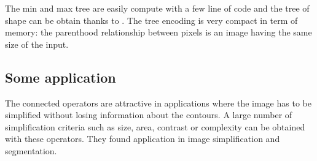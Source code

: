 The min and max tree are easily compute with a few line of code \cite{berger.07.icip} and the tree of shape can be obtain thanks to \cite{geraud.13.ismm}. The tree encoding is very compact in term of memory: the parenthood relationship between pixels is an image having the same size of the input. 

\subsection{Some application}
The connected operators are attractive in applications where the image has to be simplified without losing information about the contours. A large number of simplification criteria such as size, area, contrast or complexity can be obtained with these operators. They found application in image simplification and segmentation.